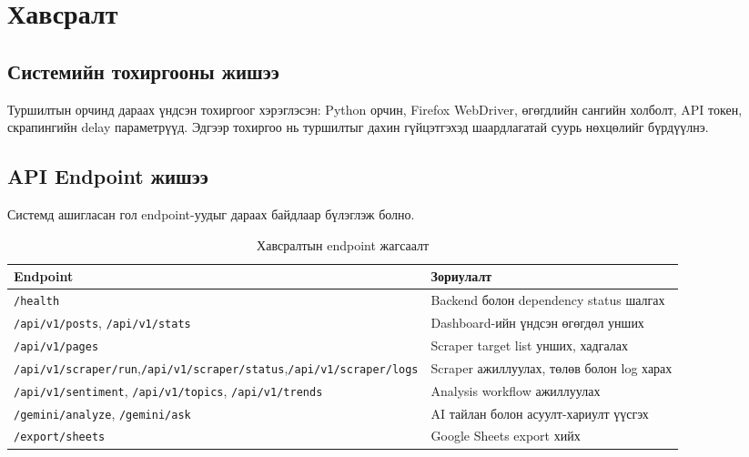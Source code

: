 \chapter{Хавсралт}

\section{Системийн тохиргооны жишээ}

Туршилтын орчинд дараах үндсэн тохиргоог хэрэглэсэн: Python орчин, Firefox WebDriver, өгөгдлийн сангийн холболт, API токен, скрапингийн delay параметрүүд. Эдгээр тохиргоо нь туршилтыг дахин гүйцэтгэхэд шаардлагатай суурь нөхцөлийг бүрдүүлнэ.

\section{API Endpoint жишээ}

Системд ашигласан гол endpoint-уудыг дараах байдлаар бүлэглэж болно.

\begin{table}[H]
\centering
\caption{Хавсралтын endpoint жагсаалт}
\small
\renewcommand{\arraystretch}{1.2}
\begin{adjustbox}{max width=\textwidth}
\begin{tabular}{|p{4.2cm}|p{9.2cm}|}
\hline
\rowcolor{gray!20}\textbf{Endpoint} & \textbf{Зориулалт} \\ \hline
\texttt{/health} & Backend болон dependency status шалгах \\ \hline
\texttt{/api/v1/posts}, \texttt{/api/v1/stats} & Dashboard-ийн үндсэн өгөгдөл унших \\ \hline
\texttt{/api/v1/pages} & Scraper target list унших, хадгалах \\ \hline
\texttt{/api/v1/scraper/run},\newline\texttt{/api/v1/scraper/}\newline\texttt{status},\newline\texttt{/api/v1/scraper/logs} & Scraper ажиллуулах, төлөв болон log харах \\ \hline
\texttt{/api/v1/sentiment}, \texttt{/api/v1/topics}, \texttt{/api/v1/trends} & Analysis workflow ажиллуулах \\ \hline
\texttt{/gemini/analyze}, \texttt{/gemini/ask} & AI тайлан болон асуулт-хариулт үүсгэх \\ \hline
\texttt{/export/sheets} & Google Sheets export хийх \\ \hline
\end{tabular}
\end{adjustbox}
\normalsize
\end{table}

